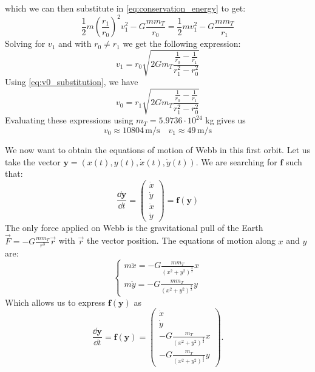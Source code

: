 which we can then substitute in \autoref{eq:conservation_energy} to get:
\begin{equation}
    \frac{1}{2} m \left(\frac{r_1}{r_0}\right)^2 v_1^2 - G \frac{m m_T}{r_0} = \frac{1}{2} m v_1^2 - G \frac{m m_T}{r_1}
\end{equation}
Solving for \(v_1\) and with $r_0 \neq r_1$ we get the following expression:
\begin{equation}
    v_1 = r_0 \sqrt{2 G m_T \frac{\frac{1}{r_0}-\frac{1}{r_1}}{r_1^2-r_0^2}}
\end{equation}
Using \autoref{eq:v0_substitution}, we have
\begin{equation}
    v_0 = r_1 \sqrt{2 G m_T \frac{\frac{1}{r_0}-\frac{1}{r_1}}{r_1^2-r_0^2}}
    \label{eq:v0_final}
\end{equation}
Evaluating these expressions using \(m_T = 5.9736 \cdot 10^{24}\) kg gives us
\begin{equation}
    v_0 \approx 10804 \, \textrm{m/s} \quad v_1 \approx 49 \, \textrm{m/s}
\end{equation}

We now want to obtain the equations of motion of Webb in this first orbit. Let us take the vector \(\mathbf{y} = (x(t), y(t), \dot x(t), \dot y(t))\). We are searching for \(\mathbf{f}\) such that:
\begin{equation}
    \frac{\dd \mathbf{y}}{\dd t} = \left(\begin{matrix} \dot x \\ \dot y \\ \ddot x \\ \ddot y \end{matrix}\right) = \mathbf{f}(\mathbf{y})
\end{equation}
The only force applied on Webb is the gravitational pull of the Earth $\vec{F} = -G \frac{m m_T}{r^3}\vec{r}$ with $\vec{r}$ the vector position. The equations of motion along \(x\) and \(y\) are:
\begin{equation}
    \begin{cases}
        m \ddot x = -G \frac{m m_T}{\left(x^2+y^2\right)^\frac{3}{2}} x \\
        m \ddot y = -G \frac{m m_T}{\left(x^2+y^2\right)^\frac{3}{2}} y
    \end{cases}
\end{equation}
Which allows us to express \(\mathbf{f}(\mathbf{y})\) as
\begin{equation}
    \frac{\dd \mathbf{y}}{\dd t} = \mathbf{f}(\mathbf{y}) = \left(\begin{matrix} \dot x \\ \dot y \\ -G \frac{m_T}{\left(x^2+y^2\right)^\frac{3}{2}} x \\ -G \frac{m_T}{\left(x^2+y^2\right)^\frac{3}{2}} y \end{matrix}\right).
\end{equation}

